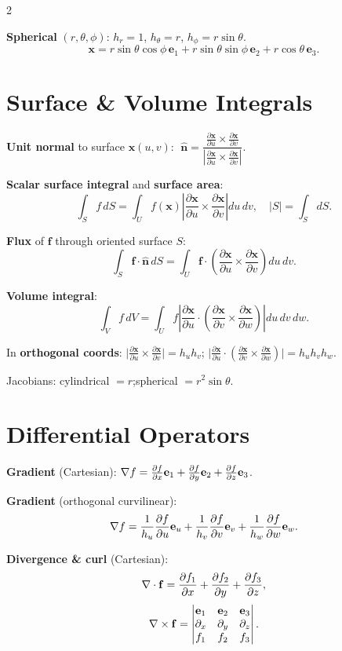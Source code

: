 \documentclass[10pt,a4paper]{article}
\newcommand{\kw}[1]{\textbf{#1}}
\newcommand{\p}[2]{\frac{\partial #1}{\partial #2}}      %
\newcommand{\hvn}{\hat{\mathbf{n}}}
\newcommand{\vx}{\mathbf{x}}
\newcommand{\vf}{\mathbf{f}}
\newcommand{\eu}{\mathbf{e}_u}
\newcommand{\ev}{\mathbf{e}_v}
\newcommand{\ew}{\mathbf{e}_w}
\begin{document}
\begin{multicols}{2}
\begin{defbox}
\textbf{Spherical} $(r,\theta,\phi)$:
$h_r=1$, $h_\theta=r$, $h_\phi=r\sin\theta$.
\[
  \vx = r\sin\theta\cos\phi\,\mathbf{e}_1
      + r\sin\theta\sin\phi\,\mathbf{e}_2
      + r\cos\theta\,\mathbf{e}_3.
\]
\end{defbox}

\section{Surface \& Volume Integrals}

\begin{defbox}
\kw{Unit normal} to surface $\vx(u,v)$:
$\;\hvn = \dfrac{\p{\vx}{u}\times\p{\vx}{v}}
               {\left|\p{\vx}{u}\times\p{\vx}{v}\right|}$.

\kw{Scalar surface integral} and \kw{surface area}:
\[
  \int_S f\,dS
  = \int_U f(\vx)\left|\p{\vx}{u}\times\p{\vx}{v}\right|du\,dv,
  \quad |S|=\int_S dS.
\]

\kw{Flux} of $\vf$ through oriented surface $S$:
\[
  \int_S\vf\cdot\hvn\,dS
  = \int_U\vf\cdot\!\left(\p{\vx}{u}\times\p{\vx}{v}\right)du\,dv.
\]

\kw{Volume integral}:
\[
  \int_V f\,dV
  = \int_U f\left|\p{\vx}{u}\cdot\!\left(\p{\vx}{v}\times\p{\vx}{w}\right)\right|du\,dv\,dw.
\]

In \textbf{orthogonal coords}:
$\bigl|\p{\vx}{u}\times\p{\vx}{v}\bigr|=h_uh_v$;\quad
$\bigl|\p{\vx}{u}\cdot(\p{\vx}{v}\times\p{\vx}{w})\bigr|=h_uh_vh_w$.

Jacobians: cylindrical $=r$;\quad spherical $=r^2\!\sin\theta$.
\end{defbox}

\section{Differential Operators}

\begin{defbox}
\textbf{Gradient} (Cartesian):
\;$\bnabla f = \p{f}{x}\mathbf{e}_1+\p{f}{y}\mathbf{e}_2+\p{f}{z}\mathbf{e}_3$.

\textbf{Gradient} (orthogonal curvilinear):
\[
  \bnabla f
  = \frac{1}{h_u}\p{f}{u}\eu
  + \frac{1}{h_v}\p{f}{v}\ev
  + \frac{1}{h_w}\p{f}{w}\ew.
\]

\textbf{Divergence \& curl} (Cartesian):
\[
  \bnabla\cdot\vf
  = \p{f_1}{x}+\p{f_2}{y}+\p{f_3}{z},
\]
\[
  \bnabla\times\vf
  = \begin{vmatrix}
      \mathbf{e}_1 & \mathbf{e}_2 & \mathbf{e}_3\\
      \partial_x & \partial_y & \partial_z\\
      f_1 & f_2 & f_3
    \end{vmatrix}.
\]


\end{defbox}
\end{multicols}
\end{document}

